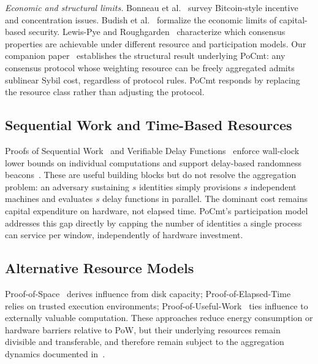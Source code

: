 \documentclass[10pt,journal,twoside]{IEEEtran}
\theoremstyle{remark}
\begin{document}
	\emph{Economic and structural limits.}
	Bonneau et al.~\cite{bonneau2015sok} survey Bitcoin-style
	incentive and concentration issues.
	Budish et al.~\cite{budish2024economic} formalize the
	economic limits of capital-based security.
	Lewis-Pye and Roughgarden~\cite{lewispye2023permissionless}
	characterize which consensus properties are achievable
	under different resource and participation models.
	Our companion paper~\cite{maleki2025scarcity} establishes
	the structural result underlying PoCmt: any consensus
	protocol whose weighting resource can be freely aggregated
	admits sublinear Sybil cost, regardless of protocol rules.
	PoCmt responds by replacing the resource class rather than
	adjusting the protocol.
	
	\subsection{Sequential Work and Time-Based Resources}
	\label{ssec:rw-sequential}
	
	Proofs of Sequential Work~\cite{cohen2018sequential,
		mahmoody2013sequential} and Verifiable Delay
	Functions~\cite{boneh2018vdf,wesolowski2019vdf} enforce
	wall-clock lower bounds on individual computations and
	support delay-based randomness beacons~\cite{syta2017drand}.
	These are useful building blocks but do not resolve the
	aggregation problem: an adversary sustaining $s$ identities
	simply provisions $s$ independent machines and evaluates
	$s$ delay functions in parallel.
	The dominant cost remains capital expenditure on hardware,
	not elapsed time.
	PoCmt's participation model addresses this gap directly by
	capping the number of identities a single process can
	service per window, independently of hardware investment.
	
	\subsection{Alternative Resource Models}
	\label{ssec:rw-alt}
	
	Proof-of-Space~\cite{dziembowski2015spacemint} derives
	influence from disk capacity;
	Proof-of-Elapsed-Time~\cite{abadi2016poet,chen2017poetanalysis}
	relies on trusted execution environments;
	Proof-of-Useful-Work~\cite{ball2017proofs} ties influence
	to externally valuable computation.
	These approaches reduce energy consumption or hardware
	barriers relative to PoW, but their underlying resources
	remain divisible and transferable, and therefore remain
	subject to the aggregation dynamics documented
	in~\cite{maleki2025scarcity}.
	
\end{document}
